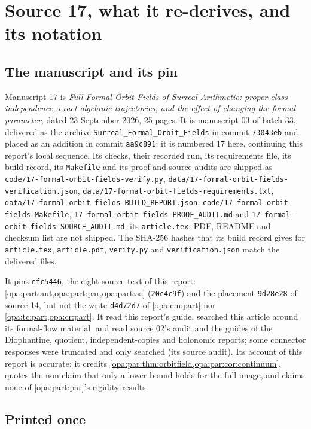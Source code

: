 \documentclass[11pt,oneside]{article}
\numberwithin{equation}{section}
\theoremstyle{definition}
\theoremstyle{remark}
\newcommand{\fn}[1]{\nolinkurl{#1}}
\begin{document}
\section{Source 17, what it re-derives, and its notation}\label{opa:of:sec:intro}

\subsection{The manuscript and its pin}\label{opa:of:sub:source}

Manuscript 17 is \emph{Full Formal Orbit Fields of Surreal Arithmetic: proper-class independence, exact algebraic
trajectories, and the effect of changing the formal parameter}, dated 23 September 2026, 25 pages. It is manuscript 03
of batch 33, delivered as the archive \fn{Surreal_Formal_Orbit_Fields} in commit \texttt{73043eb} and placed as an
addition in commit \texttt{aa9c891}; it is numbered 17 here, continuing this report's local sequence. Its checks,
their recorded run, its requirements file, its build record, its \fn{Makefile} and its proof and source audits are
shipped as \fn{code/17-formal-orbit-fields-verify.py}, \fn{data/17-formal-orbit-fields-verification.json},
\fn{data/17-formal-orbit-fields-requirements.txt}, \fn{data/17-formal-orbit-fields-BUILD_REPORT.json},
\fn{code/17-formal-orbit-fields-Makefile}, \fn{17-formal-orbit-fields-PROOF_AUDIT.md} and
\fn{17-formal-orbit-fields-SOURCE_AUDIT.md}; its \fn{article.tex}, PDF, README and checksum list are not shipped. The
SHA-256 hashes that its build record gives for \fn{article.tex}, \fn{article.pdf}, \fn{verify.py} and
\fn{verification.json} match the delivered files.

It pins \texttt{efc5446}, the eight-source text of this report: \cref{opa:part:aut,opa:part:par,opa:part:as}
(\texttt{20c4c9f}) and the placement \texttt{9d28e28} of source 14, but not the write \texttt{d4d72d7} of
\cref{opa:cm:part} nor \cref{opa:tc:part,opa:cr:part}. It read this report's guide, searched this article around
its formal-flow material, and read source 02's audit and the guides of the Diophantine, quotient, independent-copies
and holonomic reports; some connector responses were truncated and only searched (its source audit). Its account of
this report is accurate: it credits \cref{opa:par:thm:orbitfield,opa:par:cor:continuum}, quotes the non-claim that only
a lower bound holds for the full image, and claims none of \cref{opa:part:par}'s rigidity results.

\subsection{Printed once}\label{opa:of:sub:once}
\end{document}
